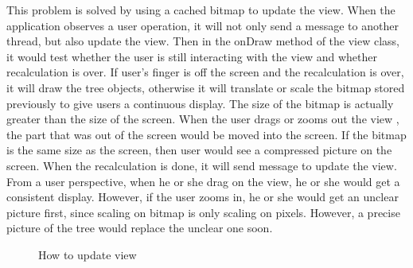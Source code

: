 \documentclass[MSc]{icldt}
\begin{document}
This problem is solved by using a cached bitmap to update the view. When the application observes a user operation, it will not only send a message to another thread, but also update the view. Then in the onDraw method of the view class, it would test whether the user is still interacting with the view and whether recalculation is over. If user's finger is off the screen and the recalculation is over, it will draw the tree objects, otherwise it will translate or scale the bitmap stored previously to give users a continuous display. The size of the bitmap is actually greater than the size of the screen. When the user drags or zooms out the view , the part that was out of the screen would be moved into the screen. If the bitmap is the same size as the screen, then user would see a compressed picture on the screen. 
When the recalculation is done, it will send message to update the view. From a user perspective, when he or she drag on the view, he or she would get a consistent display. However, if the user zooms in, he or she would get an unclear picture first, since scaling on bitmap is only scaling on pixels. However, a precise picture of the tree would replace the unclear one soon. 

\begin{figure}[H]
\caption{How to update view}
\end{figure}
\end{document}
